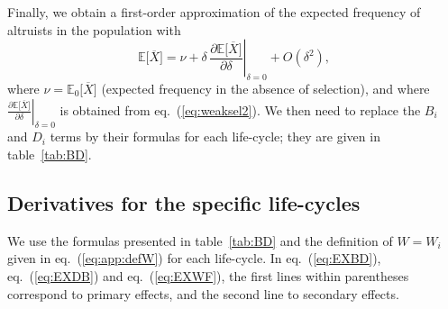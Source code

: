 \documentclass[11pt, letterpaper]{article}
\renewcommand{\eqref}[1]{\textup{{\normalfont eq.~(\ref{#1}}\normalfont)}}
\newcommand{\deriv}[2]{\partial_{#2}\!{#1}\,}
\newcommand{\derivv}[3]{\left.\frac{\partial #1}{\partial #2}\right |_{#3=0}} %
\newcommand{\Esp}[1]{\mathbb{E}\big[ #1\big]}%
\newcommand{\Espzero}[1]{\mathbb{E}_0\big[ #1\big]}%
\newcommand{\bigO}[1]{O\left( #1 \right)}
\newcommand{\mutbias}{\nu}
\newcommand{\selstr}{\delta}
\begin{document}
Finally, we obtain a first-order approximation of the expected frequency of altruists in the population with 
\begin{equation}\label{eq:app:EXgeneric}
\Esp{\overline{X}} = \mutbias + \selstr \,  \derivv{\Esp{\overline{X}}}{\selstr}{\selstr} + \bigO{\selstr^2},
\end{equation}
where $\nu = \Espzero{\overline{X}}$ (expected frequency in the absence of selection), and where $\derivv{\Esp{\overline{X}}}{\selstr}{\selstr}$ is obtained from \eqref{eq:weaksel2}. We then need to replace the $B_{i}$ and $D_{i}$ terms by their formulas for each life-cycle; they are given in table~\ref{tab:BD}.

\subsection{Derivatives for the specific life-cycles\label{sec:app:dW}}

We use the formulas presented in table~\ref{tab:BD} and the definition of $W=W_i$ given in \eqref{eq:app:defW} for each life-cycle. In \eqref{eq:EXBD}, \eqref{eq:EXDB} and \eqref{eq:EXWF}, the first lines within parentheses correspond to primary effects, and the second line to secondary effects. 
\end{document}
